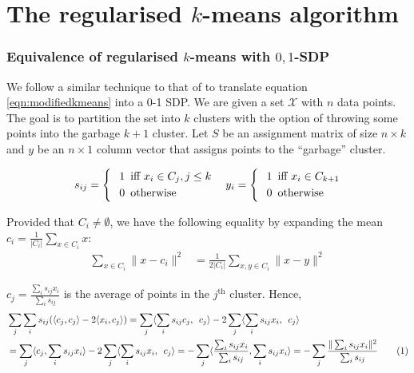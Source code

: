 \documentclass[12pt]{article}
\newcommand{\mc}{\mathcal}
\newcommand\numberthis{\addtocounter{equation}{1}\tag{\theequation}}
\begin{document}
\section{The regularised $k$-means algorithm}
\label{a-section:heuristic}
 
\subsubsection{Equivalence of regularised $k$-means with $0,1$-SDP}
\label{a-subsection:modifiedkmeans01sdp}
We follow a similar technique to that of \cite{peng2007approximating} to translate equation \ref{eqn:modifiedkmeans} into a 0-1 SDP. We are given a set $\mc X$ with $n$ data points. The goal is to partition the set into $k$ clusters with the option of throwing some points into the garbage $k+1$ cluster. Let $S$ be an assignment matrix of size $n\times k$ and $y$ be an $n \times 1$ column vector that assigns points to the ``garbage'' cluster.  

 \[s_{ij} = 
    \begin{dcases}
		\hspace{0.1in} 1 \enspace \text{iff }x_i \in C_j, j \leq k\\
		\hspace{0.1in} 0 \enspace \text{otherwise}
	\end{dcases}
 \quad y_{i} = 
    \begin{dcases}
		\hspace{0.1in} 1 \enspace \text{iff }x_i \in C_{k+1}\\
		\hspace{0.1in} 0 \enspace \text{otherwise}
	\end{dcases}
\]

Provided that $C_i\ne\emptyset$, we have the following equality by expanding the mean $c_i = \frac{1}{|C_i|} \sum_{x\in C_i} x$:
\begin{align}
\label{a-eqn:kmeansobj1}
\sum_{x \in C_i} \|x-c_i\|^2 
&= \frac{1}{2|C_i|}\sum_{x, y \in C_i} \|x-y\|^2 
\end{align}

\noindent $c_j = \frac{\sum_{i} s_{ij} x_i}{\sum_{i} s_{ij}}$ is the average of points in the $j^{\text{th}}$ cluster. Hence,
\begin{align*}
	&\sum_j \sum_i s_{ij}(\langle c_j, c_j\rangle -2\langle x_i, c_j\rangle) = 	 \sum_j \langle\sum_i s_{ij} c_j, \enspace c_j\rangle - 2 \sum_j \langle\sum_i s_{ij} x_i, \enspace c_j\rangle \\
	&=\sum_j \langle c_j, \sum_i s_{ij}x_i\rangle - 2 \sum_j \langle\sum_i s_{ij} x_i, \enspace c_j\rangle = -\sum_j \langle\frac{\sum_i s_{ij} x_i}{\sum_i s_{ij}}, \sum_i s_{ij}x_i\rangle = -\sum_j \frac{\| \sum_i s_{ij} x_i\|^2}{\sum_i s_{ij}} \numberthis \label{a-eqn:kmeansobj2}
\end{align*}
\end{document}
